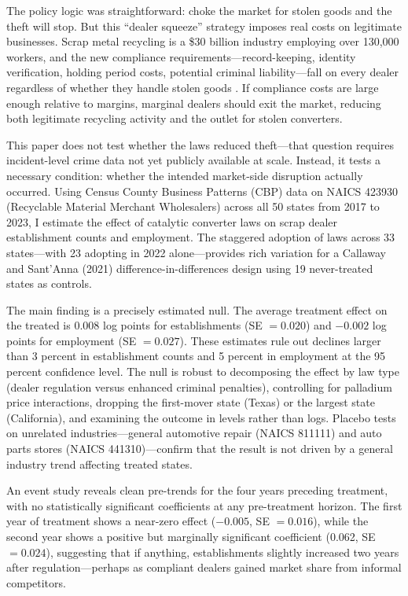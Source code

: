 \documentclass[12pt]{article}
\begin{document}
The policy logic was straightforward: choke the market for stolen goods and the theft will stop. But this ``dealer squeeze'' strategy imposes real costs on legitimate businesses. Scrap metal recycling is a \$30 billion industry employing over 130,000 workers, and the new compliance requirements---record-keeping, identity verification, holding period costs, potential criminal liability---fall on every dealer regardless of whether they handle stolen goods \citep{isri2023}. If compliance costs are large enough relative to margins, marginal dealers should exit the market, reducing both legitimate recycling activity and the outlet for stolen converters.

This paper does not test whether the laws reduced theft---that question requires incident-level crime data not yet publicly available at scale. Instead, it tests a necessary condition: whether the intended market-side disruption actually occurred. Using Census County Business Patterns (CBP) data on NAICS 423930 (Recyclable Material Merchant Wholesalers) across all 50 states from 2017 to 2023, I estimate the effect of catalytic converter laws on scrap dealer establishment counts and employment. The staggered adoption of laws across 33 states---with 23 adopting in 2022 alone---provides rich variation for a Callaway and Sant'Anna (2021) difference-in-differences design using 19 never-treated states as controls.

The main finding is a precisely estimated null. The average treatment effect on the treated is 0.008 log points for establishments (SE $= 0.020$) and $-0.002$ log points for employment (SE $= 0.027$). These estimates rule out declines larger than 3 percent in establishment counts and 5 percent in employment at the 95 percent confidence level. The null is robust to decomposing the effect by law type (dealer regulation versus enhanced criminal penalties), controlling for palladium price interactions, dropping the first-mover state (Texas) or the largest state (California), and examining the outcome in levels rather than logs. Placebo tests on unrelated industries---general automotive repair (NAICS 811111) and auto parts stores (NAICS 441310)---confirm that the result is not driven by a general industry trend affecting treated states.

An event study reveals clean pre-trends for the four years preceding treatment, with no statistically significant coefficients at any pre-treatment horizon. The first year of treatment shows a near-zero effect ($-0.005$, SE $= 0.016$), while the second year shows a positive but marginally significant coefficient (0.062, SE $= 0.024$), suggesting that if anything, establishments slightly increased two years after regulation---perhaps as compliant dealers gained market share from informal competitors.
\end{document}
